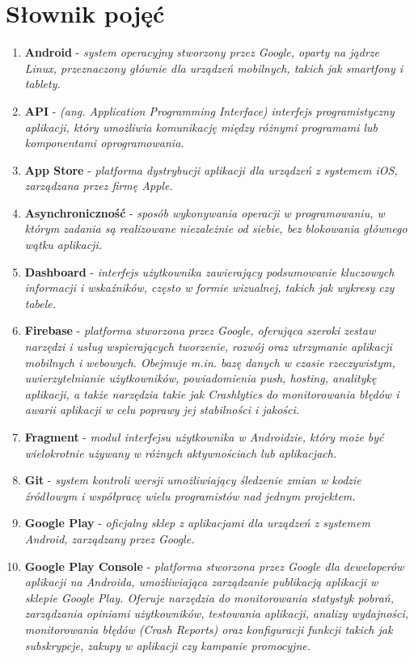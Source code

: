 \section{Słownik pojęć}
\begin{enumerate}[leftmargin=*]
\item \textbf{Android} - \textit{system operacyjny stworzony przez Google, oparty na jądrze Linux, przeznaczony głównie dla urządzeń mobilnych, takich jak smartfony i tablety.}
\item \textbf{API} - \textit{(ang. Application Programming Interface) interfejs programistyczny aplikacji, który umożliwia komunikację między różnymi programami lub komponentami oprogramowania.}
\item \textbf{App Store} - \textit{platforma dystrybucji aplikacji dla urządzeń z systemem iOS, zarządzana przez firmę Apple.}
\item \textbf{Asynchroniczność} - \textit{sposób wykonywania operacji w programowaniu, w którym zadania są realizowane niezależnie od siebie, bez blokowania głównego wątku aplikacji.}
\item \textbf{Dashboard} - \textit{interfejs użytkownika zawierający podsumowanie kluczowych informacji i wskaźników, często w formie wizualnej, takich jak wykresy czy tabele.}
\item \textbf{Firebase} - \textit{platforma stworzona przez Google, oferująca szeroki zestaw narzędzi i usług wspierających tworzenie, rozwój oraz utrzymanie aplikacji mobilnych i webowych. Obejmuje m.in. bazę danych w czasie rzeczywistym, uwierzytelnianie użytkowników, powiadomienia push, hosting, analitykę aplikacji, a także narzędzia takie jak Crashlytics do monitorowania błędów i awarii aplikacji w celu poprawy jej stabilności i jakości.}
\item \textbf{Fragment} - \textit{moduł interfejsu użytkownika w Androidzie, który może być wielokrotnie używany w różnych aktywnościach lub aplikacjach.}
\item \textbf{Git} - \textit{system kontroli wersji umożliwiający śledzenie zmian w kodzie źródłowym i współpracę wielu programistów nad jednym projektem.}
\item \textbf{Google Play} - \textit{oficjalny sklep z aplikacjami dla urządzeń z systemem Android, zarządzany przez Google.}
\item \textbf{Google Play Console} - \textit{platforma stworzona przez Google dla deweloperów aplikacji na Androida, umożliwiająca zarządzanie publikacją aplikacji w sklepie Google Play. Oferuje narzędzia do monitorowania statystyk pobrań, zarządzania opiniami użytkowników, testowania aplikacji, analizy wydajności, monitorowania błędów (Crash Reports) oraz konfiguracji funkcji takich jak subskrypcje, zakupy w aplikacji czy kampanie promocyjne.}

\end{enumerate}
